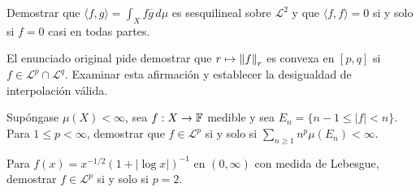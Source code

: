 \begin{ejercicio}\label{ej:v2-l18-6}
Demostrar que $\langle f,g\rangle=\int_X f\overline g\,d\mu$ es sesquilineal sobre $\mathcal L^2$ y que $\langle f,f\rangle=0$ si y solo si $f=0$ casi en todas partes.
\end{ejercicio}

\begin{ejercicio}\label{ej:v2-l18-7}
El enunciado original pide demostrar que $r\mapsto\left\lVert f\right\rVert_r$ es convexa en $[p,q]$ si $f\in\mathcal L^p\cap\mathcal L^q$. Examinar esta afirmación y establecer la desigualdad de interpolación válida.
\end{ejercicio}

\begin{ejercicio}\label{ej:v2-l18-8}
Supóngase $\mu(X)<\infty$, sea $f:X\to\mathbb F$ medible y sea $E_n=\{n-1\le|f|<n\}$. Para $1\le p<\infty$, demostrar que $f\in\mathcal L^p$ si y solo si $\sum_{n\ge1}n^p\mu(E_n)<\infty$.
\end{ejercicio}

\begin{ejercicio}\label{ej:v2-l18-9}
Para $f(x)=x^{-1/2}(1+|\log x|)^{-1}$ en $(0,\infty)$ con medida de Lebesgue, demostrar $f\in\mathcal L^p$ si y solo si $p=2$.
\end{ejercicio}


